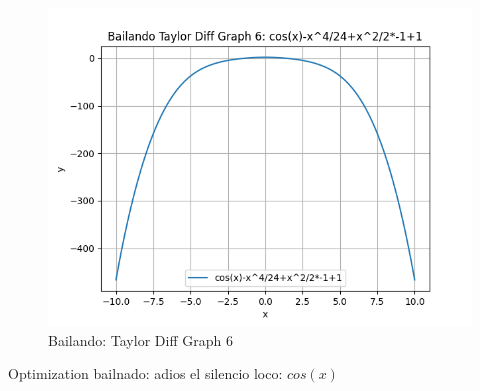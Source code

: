 \documentclass{article}
\begin{document}
\begin{figure}
\centering
\includegraphics[width=0.8\linewidth]{Bailando Taylor Diff Graph 6.png}
\caption{Bailando: Taylor Diff Graph 6}
\label{fig:my_image}
\end{figure}
 \newline \newline Optimization bailnado: \newline adios el silencio loco: $cos(x)$  \newline 
\end{document}
